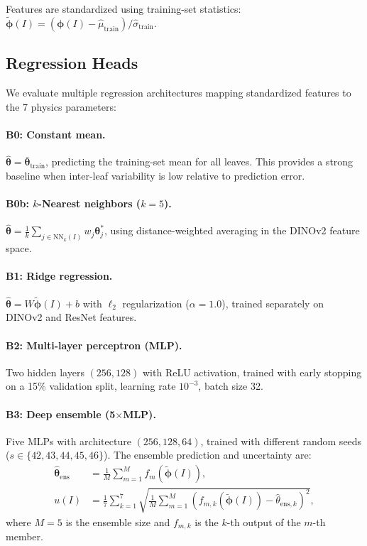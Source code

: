 \documentclass[11pt,a4paper]{article}
\newcommand{\btheta}{\boldsymbol{\theta}}
\newcommand{\bphi}{\boldsymbol{\phi}}
\begin{document}
Features are standardized using training-set statistics:
$\tilde{\bphi}(I) = (\bphi(I) - \hat{\mu}_\text{train}) / \hat{\sigma}_\text{train}$.

\subsection{Regression Heads}

We evaluate multiple regression architectures mapping standardized features
to the 7 physics parameters:

\paragraph{B0: Constant mean.}
$\hat{\btheta} = \bar{\btheta}_\text{train}$, predicting the training-set mean
for all leaves. This provides a strong baseline when inter-leaf variability
is low relative to prediction error.

\paragraph{B0b: $k$-Nearest neighbors ($k=5$).}
$\hat{\btheta} = \frac{1}{k} \sum_{j \in \text{NN}_k(I)} w_j \btheta_j^*$,
using distance-weighted averaging in the DINOv2 feature space.

\paragraph{B1: Ridge regression.}
$\hat{\btheta} = W \tilde{\bphi}(I) + b$ with $\ell_2$ regularization
($\alpha = 1.0$), trained separately on DINOv2 and ResNet features.

\paragraph{B2: Multi-layer perceptron (MLP).}
Two hidden layers $(256, 128)$ with ReLU activation, trained with
early stopping on a 15\% validation split, learning rate $10^{-3}$,
batch size 32.

\paragraph{B3: Deep ensemble (5$\times$MLP).}
Five MLPs with architecture $(256, 128, 64)$, trained with different
random seeds ($s \in \{42, 43, 44, 45, 46\}$).
The ensemble prediction and uncertainty are:
\begin{align}
\hat{\btheta}_\text{ens} &= \frac{1}{M} \sum_{m=1}^{M} f_m(\tilde{\bphi}(I)), \\
u(I) &= \frac{1}{7} \sum_{k=1}^{7} \sqrt{\frac{1}{M} \sum_{m=1}^{M}
  (f_{m,k}(\tilde{\bphi}(I)) - \hat{\theta}_{\text{ens},k})^2},
\label{eq:uncertainty}
\end{align}
where $M=5$ is the ensemble size and $f_{m,k}$ is the $k$-th output
of the $m$-th member.
\end{document}
